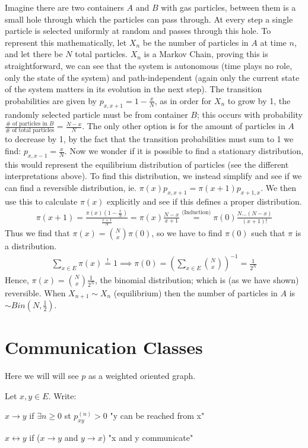 \begin{ex}
	Imagine there are two containers $A$ and $B$ with gas particles, between them is a small hole through which the particles can pass through. At every step a single particle is selected uniformly at random and passes through this hole. To represent this mathematically, let $X_n$ be the number of particles in $A$ at time $n$, and let there be $N$ total particles. $X_n$ is a Markov Chain, proving this is straightforward, we can see that the system is autonomous (time plays no role, only the state of the system) and path-independent (again only the current state of the system matters in its evolution in the next step). The transition probabilities are given by $p_{x, x+1}= 1- \frac{x}{N}$, as in order for $X_n$ to grow by 1, the randomly selected particle must be from container $B $; this occurs with probability $\frac{\# \textrm{ of particles in }B}{\# \textrm{ of total particles}} = \frac{N-x}{N}$. The only other option is for the amount of particles in $A$ to decrease by 1, by the fact that the transition probabilities must sum to 1 we find: $p_{x, x-1}= \frac{x}{N}$. Now we wonder if it is possible to find a stationary distribution, this would represent the equilibrium distribution of particles (see the different interpretations above). To find this distribution, we instead simplify and see if we can find a reversible distribution, ie. $\pi (x) p_{x,x+1} = \pi (x+1)p_{x+1, x}$. We then use this to calculate $\pi (x)$ explicitly and see if this defines a proper distribution. 
	\begin{gather}
		\pi (x+1) = \frac{\pi (x)(1 - \frac{x}{N})}{\frac{x+1}{N}} = \pi (x) \frac{N-x}{x+1} \stackrel{\textrm{(Induction)}}{=} \pi (0) \frac{N ...(N-x)}{(x+1)!} 
	\end{gather}
Thus we find that $\pi (x) = \binom{N}{x}\pi(0)$, so we have to find $\pi (0)$ such that $\pi $ is a distribution. 
\begin{gather}
	\sum_{x \in E}^{} \pi (x) \stackrel{!}{=}1 \implies \pi (0) = \left( \sum_{x \in E}^{} \binom{N}{x} \right)^{-1} = \frac{1}{2^N} 
\end{gather}	
Hence, $\pi (x)= \binom{N}{x} \frac{1}{2^N}$, the binomial distribution; which is (as we have shown) reversible. When $X_{n+1} \sim X_n$ (equilibrium) then the number of particles in $A$ is $\sim Bin(N, \frac{1}{2})$.
\end{ex}


\section{Communication Classes}
Here we will will see $p$ as a weighted oriented graph.
\begin{defn}
	Let $x,y \in E$. Write:
\itemize
\item $x \to y$ if $\exists  n \geq 0$ st $p_{xy}^{(n)}> 0$ "y can be reached from x"
\item $x \leftrightarrow y$ if ($x \to y$ and  $y\to x $) "x and y communicate"
\end{defn}

